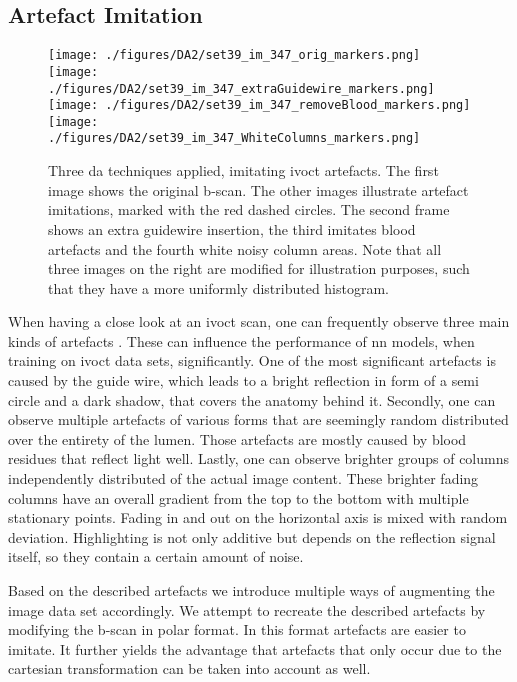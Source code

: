 \subsection{Artefact Imitation}

\begin{figure}[H]
    \centering
    \texttt{[image: ./figures/DA2/set39\_im\_347\_orig\_markers.png]}\hfill
    \texttt{[image: ./figures/DA2/set39\_im\_347\_extraGuidewire\_markers.png]}\hfill
    \texttt{[image: ./figures/DA2/set39\_im\_347\_removeBlood\_markers.png]}\hfill
    \texttt{[image: ./figures/DA2/set39\_im\_347\_WhiteColumns\_markers.png]}
    \caption[\Acrshort{da} technique: artefact imitation]{Three \acrshort{da} techniques applied, imitating \acrshort{ivoct} artefacts. The first image shows the original \Gls{b-scan}. The other images illustrate artefact imitations, marked with the red dashed circles. The second frame shows an extra guidewire insertion, the third imitates blood artefacts and the fourth white noisy column areas. Note that all three images on the right are modified for illustration purposes, such that they have a more uniformly distributed histogram.}
    \label{fig:artefactrecreation}
\end{figure}
When having a close look at an \acrshort{ivoct} scan, one can frequently observe three main kinds of artefacts \cite{GuillermoJ.Tearney.2012}. These can influence the performance of \acrshort{nn} models, when training on \acrshort{ivoct} data sets, significantly. One of the most significant artefacts is caused by the guide wire, which leads to a bright reflection in form of a semi circle and a dark shadow, that covers the anatomy behind it. Secondly, one can observe multiple artefacts of various forms that are seemingly random distributed over the entirety of the lumen. Those artefacts are mostly caused by blood residues that reflect light well. Lastly, one can observe brighter groups of columns independently distributed of the actual image content. These brighter fading columns have an overall gradient from the top to the bottom with multiple stationary points. Fading in and out on the horizontal axis is mixed with random deviation. Highlighting is not only additive but depends on the reflection signal itself, so they contain a certain amount of noise.

Based on the described artefacts we introduce multiple ways of augmenting the image data set accordingly. We attempt to recreate the described artefacts by modifying the \Gls{b-scan} in polar format. In this format artefacts are easier to imitate. It further yields the advantage that artefacts that only occur due to the cartesian transformation can be taken into account as well.

